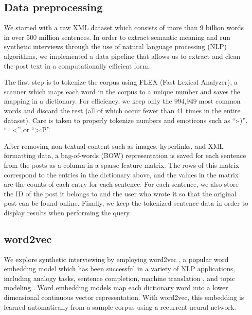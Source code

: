 \documentclass{sigchi}
\begin{document}
\subsection{Data preprocessing}

We started with a raw XML dataset which consists of more than 9 billion words in over 500 million sentences. In order to extract semantic meaning and run synthetic interviews through the use of natural language processing (NLP) algorithms, we implemented a data pipeline that allows us to extract and clean the post text in a computationally efficient form. 

The first step is to tokenize the corpus using FLEX (Fast Lexical Analyzer), a scanner which maps each word in the corpus to a unique number and saves the mapping in a dictionary. For efficiency, we keep only the 994,949 most common words and discard the rest (all of which occur fewer than 41 times in the entire dataset). Care is taken to properly tokenize numbers and emoticons such as ``:-)'', ``=<'' or ``>:P''.

After removing non-textual content such as images, hyperlinks, and XML formatting data, a bag-of-words (BOW) representation is saved for each sentence from the posts as a column in a sparse feature matrix. The rows of this matrix correspond to the entries in the dictionary above, and the values in the matrix are the counts of each entry for each sentence. For each sentence, we also store the ID of the post it belongs to and the user who wrote it so that the original post can be found online. Finally, we keep the tokenized sentence data in order to display results when performing the query.


\subsection{word2vec}
We explore synthetic interviewing by employing word2vec \cite{Mikolov2013,MikolovSCCD13}, a popular word embedding model which has been successful in a variety of NLP applications, including analogy tasks, sentence completion, machine translation \cite{W15-4908}, and topic modeling \cite{djuric2015hierarchical}. Word embedding models map each dictionary word into a lower dimensional continuous vector representation. With word2vec, this embedding is learned automatically from a sample corpus using a recurrent neural network. 
\end{document}
